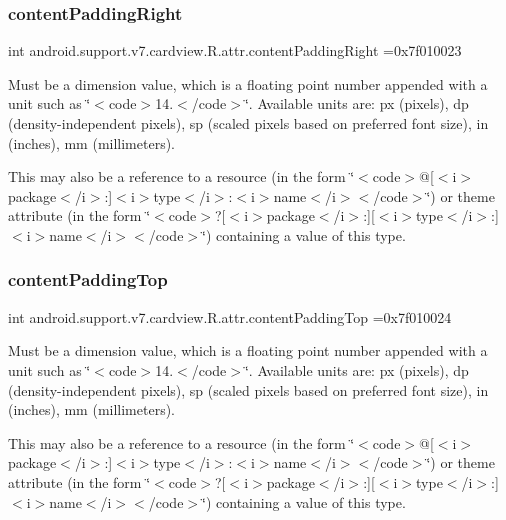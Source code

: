 \subsubsection{\texorpdfstring{content\+Padding\+Right}{contentPaddingRight}}
{\footnotesize\ttfamily int android.\+support.\+v7.\+cardview.\+R.\+attr.\+content\+Padding\+Right =0x7f010023\hspace{0.3cm}{\ttfamily [static]}}

Must be a dimension value, which is a floating point number appended with a unit such as \char`\"{}$<$code$>$14.\+5sp$<$/code$>$\char`\"{}. Available units are\+: px (pixels), dp (density-\/independent pixels), sp (scaled pixels based on preferred font size), in (inches), mm (millimeters). 

This may also be a reference to a resource (in the form \char`\"{}$<$code$>$@\mbox{[}$<$i$>$package$<$/i$>$\+:\mbox{]}$<$i$>$type$<$/i$>$\+:$<$i$>$name$<$/i$>$$<$/code$>$\char`\"{}) or theme attribute (in the form \char`\"{}$<$code$>$?\mbox{[}$<$i$>$package$<$/i$>$\+:\mbox{]}\mbox{[}$<$i$>$type$<$/i$>$\+:\mbox{]}$<$i$>$name$<$/i$>$$<$/code$>$\char`\"{}) containing a value of this type. \mbox{\label{classandroid_1_1support_1_1v7_1_1cardview_1_1R_1_1attr_affac5138f598c72e4b2d2e4d10e53711}} 
\subsubsection{\texorpdfstring{content\+Padding\+Top}{contentPaddingTop}}
{\footnotesize\ttfamily int android.\+support.\+v7.\+cardview.\+R.\+attr.\+content\+Padding\+Top =0x7f010024\hspace{0.3cm}{\ttfamily [static]}}

Must be a dimension value, which is a floating point number appended with a unit such as \char`\"{}$<$code$>$14.\+5sp$<$/code$>$\char`\"{}. Available units are\+: px (pixels), dp (density-\/independent pixels), sp (scaled pixels based on preferred font size), in (inches), mm (millimeters). 

This may also be a reference to a resource (in the form \char`\"{}$<$code$>$@\mbox{[}$<$i$>$package$<$/i$>$\+:\mbox{]}$<$i$>$type$<$/i$>$\+:$<$i$>$name$<$/i$>$$<$/code$>$\char`\"{}) or theme attribute (in the form \char`\"{}$<$code$>$?\mbox{[}$<$i$>$package$<$/i$>$\+:\mbox{]}\mbox{[}$<$i$>$type$<$/i$>$\+:\mbox{]}$<$i$>$name$<$/i$>$$<$/code$>$\char`\"{}) containing a value of this type. \mbox{\label{classandroid_1_1support_1_1v7_1_1cardview_1_1R_1_1attr_a69812852b5af9dc223c86ed8704bbacc}} 

